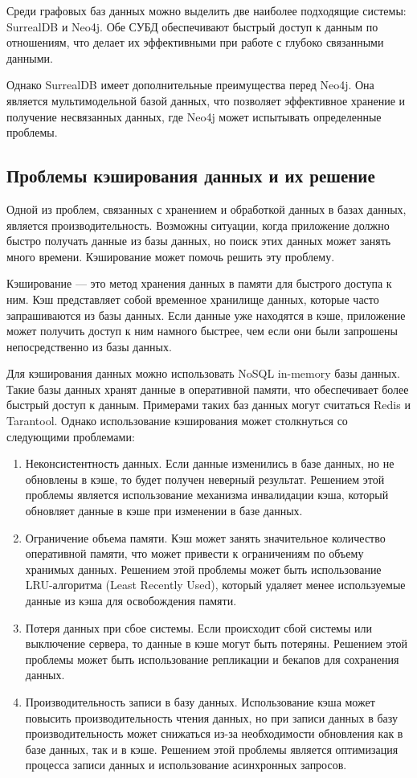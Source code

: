 Среди графовых баз данных можно выделить две наиболее подходящие системы: SurrealDB и Neo4j. Обе СУБД обеспечивают быстрый доступ к данным по отношениям, что делает их эффективными при работе с глубоко связанными данными. 

Однако SurrealDB имеет дополнительные преимущества перед Neo4j. Она является мультимодельной базой данных, что позволяет эффективное хранение и получение несвязанных данных, где Neo4j может испытывать определенные проблемы.

\subsection{Проблемы кэширования данных и их решение}

Одной из проблем, связанных с хранением и обработкой данных в базах данных, является производительность. Возможны ситуации, когда приложение должно быстро получать данные из базы данных, но поиск этих данных может занять много времени. Кэширование может помочь решить эту проблему.

Кэширование --- это метод хранения данных в памяти для быстрого доступа к ним. Кэш представляет собой временное хранилище данных, которые часто запрашиваются из базы данных. Если данные уже находятся в кэше, приложение может получить доступ к ним намного быстрее, чем если они были запрошены непосредственно из базы данных.

Для кэширования данных можно использовать NoSQL in-memory базы данных. Такие базы данных хранят данные в оперативной памяти, что обеспечивает более быстрый доступ к данным. Примерами таких баз данных могут считаться Redis и Tarantool.
Однако использование кэширования может столкнуться со следующими проблемами:
\begin{enumerate}
  \item Неконсистентность данных. Если данные изменились в базе данных, но не обновлены в кэше, то будет получен неверный результат. Решением этой проблемы является использование механизма инвалидации кэша, который обновляет данные в кэше при изменении в базе данных.
  \item Ограничение объема памяти. Кэш может занять значительное количество оперативной памяти, что может привести к ограничениям по объему хранимых данных. Решением этой проблемы может быть использование LRU-алгоритма (Least Recently Used), который удаляет менее используемые данные из кэша для освобождения памяти.
  \item Потеря данных при сбое системы. Если происходит сбой системы или выключение сервера, то данные в кэше могут быть потеряны. Решением этой проблемы может быть использование репликации и бекапов для сохранения данных.
  \item Производительность записи в базу данных. Использование кэша может повысить производительность чтения данных, но при записи данных в базу производительность может снижаться из-за необходимости обновления как в базе данных, так и в кэше. Решением этой проблемы является оптимизация процесса записи данных и использование асинхронных запросов.
\end{enumerate}

